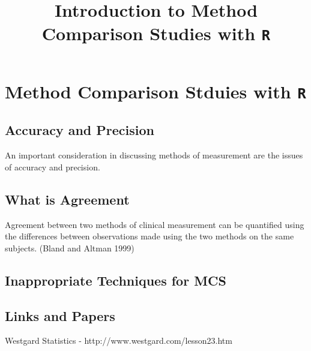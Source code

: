 \documentclass[]{article}
\title{Introduction to Method Comparison Studies with \texttt{R}}
\author{}
\begin{document}
\section{Method Comparison Stduies with \texttt{R}}

\subsection{Accuracy and Precision}

An important consideration in discussing methods of measurement are the issues of accuracy and precision.

\subsection{What is Agreement}

Agreement between two methods of clinical measurement can be quantified using the differences between observations made using the two methods on the same subjects. (Bland and Altman 1999)

\subsection{Inappropriate Techniques for MCS}


\subsection{Links and Papers}

Westgard Statistics  - http://www.westgard.com/lesson23.htm
\end{document}
